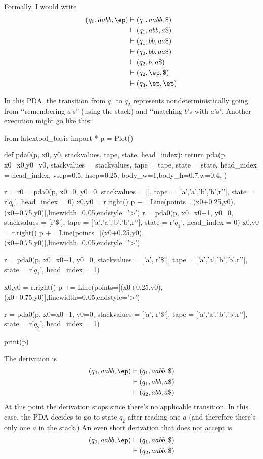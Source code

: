 Formally, I would write
\begin{align*}
  (q_0, aabb, \ep)
  &\vdash (q_1, aabb, \$) \\
  &\vdash (q_1, abb, a\$) \\
  &\vdash (q_1, bb, aa\$) \\
  &\vdash (q_2, bb, aa\$) \\
  &\vdash (q_2, b, a\$) \\
  &\vdash (q_2, \ep, \$) \\
  &\vdash (q_3, \ep, \ep) 
\end{align*}

In this PDA, the transition from $q_1$ to $q_2$ represents
nondeterministically going from \lq\lq remembering $a$'s'' (using the stack)
and \lq\lq matching $b$'s with $a$'s''.
Another execution might go like this:

\begin{python}
from latextool_basic import *
p = Plot()

def pda0(p, x0, y0, stackvalues, tape, state, head_index):
    return pda(p,
           x0=x0,y0=y0,
           stackvalues = stackvalues,
           tape = tape,
           state = state,
           head_index = head_index,
           vsep=0.5, hsep=0.25,
           body_w=1,body_h=0.7,w=0.4,
           )

r = r0 = pda0(p, x0=0, y0=0,
         stackvalues = [], tape = ['a','a','b','b',r'\SPACE'],
         state = r'$q_0$', head_index = 0)
x0,y0 = r.right()
p += Line(points=[(x0+0.25,y0),(x0+0.75,y0)],linewidth=0.05,endstyle='>')
r = pda0(p, x0=x0+1, y0=0,
        stackvalues = [r'\$'], tape = ['a','a','b','b',r'\SPACE'],
        state = r'$q_1$', head_index = 0)
x0,y0 = r.right()
p += Line(points=[(x0+0.25,y0),(x0+0.75,y0)],linewidth=0.05,endstyle='>')

r = pda0(p, x0=x0+1, y0=0,
    stackvalues = ['a', r'\$'], tape = ['a','a','b','b',r'\SPACE'],
    state = r'$q_1$', head_index = 1)

x0,y0 = r.right()
p += Line(points=[(x0+0.25,y0),(x0+0.75,y0)],linewidth=0.05,endstyle='>')

r = pda0(p, x0=x0+1, y0=0,
    stackvalues = ['a', r'\$'], tape = ['a','a','b','b',r'\SPACE'],
    state = r'$q_2$', head_index = 1)


print(p)
\end{python}

The derivation is
\begin{align*}
  (q_0, aabb, \ep)
  &\vdash (q_1, aabb, \$) \\
  &\vdash (q_1, abb, a\$) \\
  &\vdash (q_2, abb, a\$)
\end{align*}
At this point the derivation stops since there's no applicable
transition.
In this case, the PDA decides to go to state $q_2$ after reading one $a$
(and therefore there's only one $a$ in the stack.)
An even short derivation that does not accept is
\begin{align*}
  (q_0, aabb, \ep)
  &\vdash (q_1, aabb, \$) \\
  &\vdash (q_2, aabb, \$)
\end{align*}

